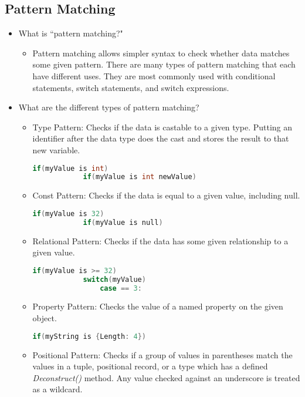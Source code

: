 \documentclass{article}
\begin{document}
\subsection{Pattern Matching}
\begin{itemize}
    \item What is ``pattern matching?"
    \begin{itemize}
        \item Pattern matching allows simpler syntax to check whether data matches some given pattern. There are many types of pattern matching that each have different uses. They are most commonly used with conditional statements, switch statements, and switch expressions.
    \end{itemize}
    \item What are the different types of pattern matching?
    \begin{itemize}
        \item Type Pattern: Checks if the data is castable to a given type. Putting an identifier after the data type does the cast and stores the result to that new variable.
         \begin{lstlisting}[language=C++]
            if(myValue is int)
            if(myValue is int newValue)\end{lstlisting}
        \item Const Pattern: Checks if the data is equal to a given value, including null.
         \begin{lstlisting}[language=C++]
            if(myValue is 32)
            if(myValue is null)\end{lstlisting} 
        \item Relational Pattern: Checks if the data has some given relationship to a given value.
        \begin{lstlisting}[language=C++]
            if(myValue is >= 32)
            switch(myValue)
                case == 3:\end{lstlisting} 
        \item Property Pattern: Checks the value of a named property on the given object.
            \begin{lstlisting}[language=C++]
                if(myString is {Length: 4}) \end{lstlisting} 
        \item Positional Pattern: Checks if a group of values in parentheses match the values in a tuple, positional record, or a type which has a defined \textit{Deconstruct()} method. Any value checked against an underscore is treated as a wildcard.
        

\end{itemize}
\end{itemize}
\end{document}
